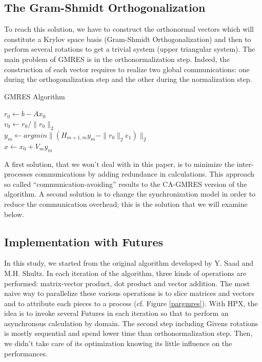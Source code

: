 \documentclass[conference]{acmsig-alternate-10pt}
\begin{document}
\subsection{The Gram-Shmidt Orthogonalization}
To reach this solution, we have to construct the orthonormal vectors which will constitute a Krylov space basis (Gram-Shmidt Orthogonalization) and then to perform several rotations to get a trivial system (upper triangular system). The main problem of GMRES is in the orthonormalization step. Indeed, the construction of each vector requires to realize two global communications: one during the orthogonalization step and the other during the normalization step.

\begin{algorithm}
\caption{GMRES Algorithm}
$r_0 \gets b-Ax_0$\\  
$v_0 \gets r_0/\|r_0\|_2$\\ 
  $y_m \gets argmin\|(H_{m+1,m}y_m - \|r_0\|_2e_1)\|_2$\\
  $x \gets x_0 + V_my_m$
\end{algorithm}

A first solution, that we won't deal with in this paper, is to minimize the inter-processes communications by adding redundance in calculations. This approach so called \enquote{communication-avoiding} \cite{CAGMRES} results to the CA-GMRES version of the algorithm. A second solution is to change the synchronization model in order to reduce the communication overhead; this is the solution that we will examine below.

\subsection{Implementation with Futures}
In this study, we started from the original algorithm \cite{GMRES} developed by Y. Saad and M.H. Shultz. In each iteration of the algorithm, three kinds of operations are performed: matrix-vector product, dot product and vector addition. The most naive way to parallelize these various operations is to slice matrices and vectors and to attribute each pieces to a process (cf. Figure \ref{pargmres}). With HPX, the idea is to invoke several Futures in each iteration so that to perform an asynchronous calculation by domain. The second step including Givens rotations is mostly sequential and spend lower time than orthonormalization step. Then, we didn't take care of its optimization knowing its little influence on the performances.
\end{document}
